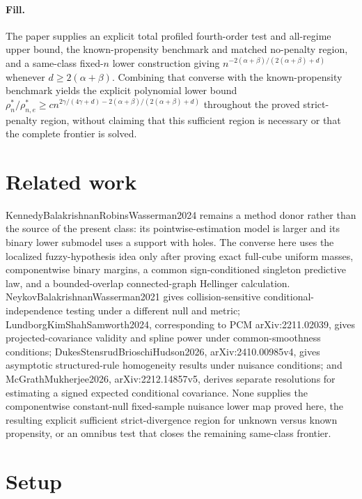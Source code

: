 \documentclass{article}
\begin{document}
\paragraph{Fill.} The paper supplies an explicit total profiled fourth-order test and all-regime upper bound, the known-propensity benchmark and matched no-penalty region, and a same-class fixed-\(n\) lower construction giving \(n^{-2(\alpha+\beta)/(2(\alpha+\beta)+d)}\) whenever \(d\ge2(\alpha+\beta)\).  Combining that converse with the known-propensity benchmark yields the explicit polynomial lower bound \(\rho_n^*/\rho_{n,e}^*\ge c n^{2\gamma/(4\gamma+d)-2(\alpha+\beta)/(2(\alpha+\beta)+d)}\) throughout the proved strict-penalty region, without claiming that this sufficient region is necessary or that the complete frontier is solved.

\section{Related work}

KennedyBalakrishnanRobinsWasserman2024 remains a method donor rather than the source of the present class: its pointwise-estimation model is larger and its binary lower submodel uses a support with holes.  The converse here uses the localized fuzzy-hypothesis idea only after proving exact full-cube uniform masses, componentwise binary margins, a common sign-conditioned singleton predictive law, and a bounded-overlap connected-graph Hellinger calculation.  NeykovBalakrishnanWasserman2021 gives collision-sensitive conditional-independence testing under a different null and metric; LundborgKimShahSamworth2024, corresponding to PCM arXiv:2211.02039, gives projected-covariance validity and spline power under common-smoothness conditions; DukesStensrudBrioschiHudson2026, arXiv:2410.00985v4, gives asymptotic structured-rule homogeneity results under nuisance conditions; and McGrathMukherjee2026, arXiv:2212.14857v5, derives separate resolutions for estimating a signed expected conditional covariance.  None supplies the componentwise constant-null fixed-sample nuisance lower map proved here, the resulting explicit sufficient strict-divergence region for unknown versus known propensity, or an omnibus test that closes the remaining same-class frontier.

\section{Setup}
\end{document}
